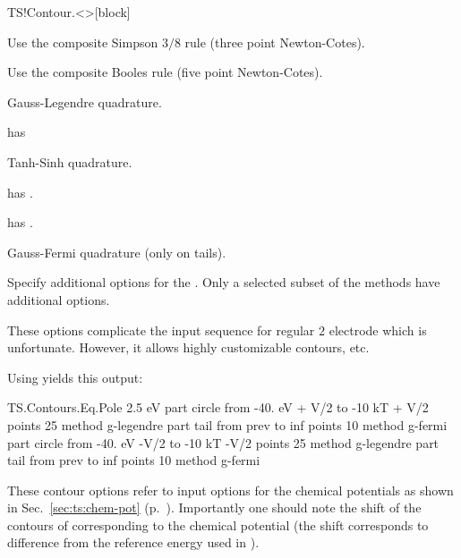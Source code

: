 \begin{fdfentry}{TS!Contour.<>}[block]
\begin{fdfoptions}
\begin{fdfoptions}
      Use the composite Simpson $3/8$ rule (three point Newton-Cotes).

      Use the composite Booles rule (five point Newton-Cotes).
 
      \option[G-legendre]%
      Gauss-Legendre quadrature.

      \note has 

      Tanh-Sinh quadrature.

      \note has .

      \note has .

      \option[G-Fermi]%
      Gauss-Fermi quadrature (only on tails).

    \end{fdfoptions}

    \option[opt]%

    Specify additional options for the . Only a selected
    subset of the methods have additional options.

  \end{fdfoptions}
  
\end{fdfentry}

These options complicate the input sequence for regular $2$ electrode
which is unfortunate. However, it allows highly customizable contours,
etc.

Using  yields this output:
\begin{fdfexample}
  TS.Contours.Eq.Pole 2.5 eV
    part circle
     from -40. eV + V/2 to -10 kT + V/2
       points 25
        method g-legendre
    part tail
     from prev to inf
       points 10
        method g-fermi
    part circle
     from -40. eV -V/2 to -10 kT -V/2
       points 25
        method g-legendre
    part tail
     from prev to inf
       points 10
        method g-fermi
\end{fdfexample}
These contour options refer to input options for the chemical
potentials as shown in Sec.~\ref{sec:ts:chem-pot}
(p.~\pageref{sec:ts:chem-pot}). Importantly one should note the shift
of the contours of corresponding to the chemical potential (the shift
corresponds to difference from the reference energy used in \tsiesta).


